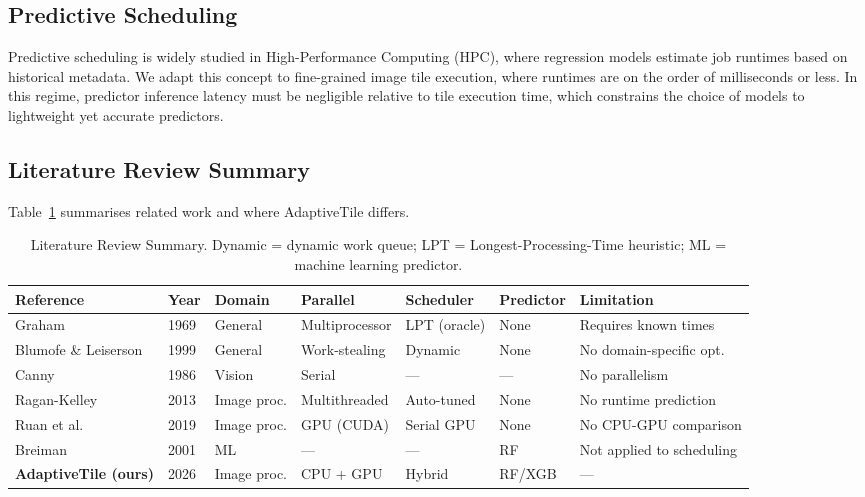 \documentclass[acmsmall]{acmart}
\begin{document}
\subsection{Predictive Scheduling}

Predictive scheduling is widely studied in High-Performance Computing (HPC), where regression models estimate job runtimes based on historical metadata. 
We adapt this concept to fine-grained image tile execution, where runtimes are on the order of milliseconds or less. 
In this regime, predictor inference latency must be negligible relative to tile execution time, which constrains the choice of models to lightweight yet accurate predictors.

\subsection{Literature Review Summary}

Table~\ref{tab:litreview} summarises related work and where AdaptiveTile differs.

\begin{table}[htbp]
  \caption{Literature Review Summary. Dynamic = dynamic work queue; LPT = Longest-Processing-Time heuristic; ML = machine learning predictor.}
  \label{tab:litreview}
  \small
  \begin{tabularx}{\textwidth}{lXXXXXX}
    \toprule
    \textbf{Reference} & \textbf{Year} & \textbf{Domain} & \textbf{Parallel} & \textbf{Scheduler} & \textbf{Predictor} & \textbf{Limitation} \\
    \midrule
    Graham~\cite{Graham1969}               & 1969 & General     & Multiprocessor & LPT (oracle)  & None       & Requires known times \\
    Blumofe \& Leiserson~\cite{Blumofe1999}& 1999 & General     & Work-stealing  & Dynamic       & None       & No domain-specific opt. \\
    Canny~\cite{Canny1986}                 & 1986 & Vision      & Serial         & ---           & ---        & No parallelism \\
    Ragan-Kelley~\cite{Ragan-Kelley2013}   & 2013 & Image proc. & Multithreaded  & Auto-tuned   & None       & No runtime prediction \\
    Ruan et al.~\cite{Ruan2019}            & 2019 & Image proc. & GPU (CUDA)     & Serial GPU    & None       & No CPU-GPU comparison \\
    Breiman~\cite{Breiman2001}             & 2001 & ML          & ---            & ---           & RF         & Not applied to scheduling \\
    \textbf{AdaptiveTile (ours)}           & 2026 & Image proc. & CPU + GPU      & Hybrid        & RF/XGB     & --- \\
    \bottomrule
  \end{tabularx}
\end{table}
\end{document}
